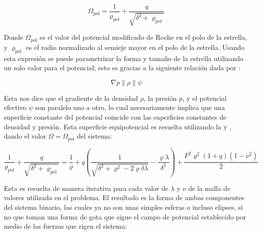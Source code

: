 \begin{eqfloat}[!ht]
	\centering
	\begin{equation}
		\Omega_{\textrm{pol}} = \frac{1}{\varrho_{\textrm{pol}}} + \frac{q}{\sqrt{\delta^2 + \varrho_{\textrm{pol}}}}
	\end{equation}
	\blankcaption
	\label{ecuacionPotencialPoloRadio}
\end{eqfloat}

Donde $\Omega_{\textrm{pol}}$ es el valor del potencial modificado de Roche en
el polo de la estrella, y $\varrho_{\textrm{pol}}$ es el radio normalizado al
semieje mayor en el polo de la estrella. Usando esta expresión se puede
parametrizar la forma y tamaño de la estrella utilizando un solo valor para el
potencial; esto es gracias a la siguiente relación dada por
:

\begin{eqfloat}[!ht]
	\centering
	\begin{equation}
		\nabla p \parallel \rho \parallel \psi
	\end{equation}
\end{eqfloat}

\newpage

Esta nos dice que el gradiente de la densidad $\rho$, la presión $p$, y el
potencial efectivo $\psi$ son paralelo uno a otro, lo cual necesariamente
implica que una superficie constante del potencial coincide con las superficies
constantes de densidad y presión. Esta superficie equipotencial es resuelta
utilizando la  y
, dando el valor $\Omega =
\Omega_{\textrm{pol}}$ del sistema:

\begin{eqfloat}[!ht]
	\centering
	\begin{equation}
		\frac{1}{\varrho_{\textrm{pol}}} + \frac{q}{\sqrt{\delta^2 + \varrho_{\textrm{pol}}}} = \frac{1}{\varrho} + q \left(\frac{1}{\sqrt{\delta^2 + \varrho^2 - 2\varrho \delta \lambda}} - \frac{\varrho \lambda}{\delta^2} \right) + \frac{F^2 \varrho^2 (1 + q)(1 - \nu^2)}{2}
	\end{equation}
	\blankcaption
	\label{ecuacionRadioPolarEstelarEquivalencia}
\end{eqfloat}

Esta es resuelta de manera iterativa para cada valor de $\lambda$ y $\nu$ de la
malla de valores utilizada en el problema. El resultado es la forma de ambas
componentes del sistema binario, las cuales ya no son unas simples esferas o
incluso elipses, si no que toman una forma de gota que sigue el campo de
potencial establecido por medio de las fuerzas que rigen el sistema:

